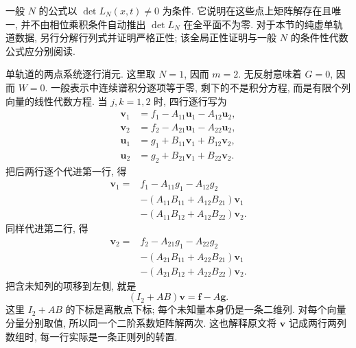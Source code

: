一般 $N$ 的公式以 $\det L_N(x,t)\ne0$ 为条件.
它说明在这些点上矩阵解存在且唯一,
并不由相位乘积条件自动推出 $\det L_N$ 在全平面不为零.
对于本节的纯虚单轨道数据,
另行分解行列式并证明严格正性;
该全局正性证明与一般 $N$ 的条件性代数公式应分别阅读.



\par\smallskip\noindent 单轨道的两点系统逐行消元.\quad
这里取 $N=1$, 因而 $m=2$. 无反射意味着 $G=0$, 因而 $W=0$.
一般表示中连续谱积分逐项等于零, 剩下的不是积分方程, 而是有限个列向量的线性代数方程.
当 $j,k=1,2$ 时, 四行逐行写为
\begin{equation*}
\begin{aligned}
\mathbf v_1
&=f_1- A_{11}\mathbf u_1- A_{12}\mathbf u_2,\\
\mathbf v_2
&=f_2- A_{21}\mathbf u_1- A_{22}\mathbf u_2,\\
\mathbf u_1
&=g_1+ B_{11}\mathbf v_1+ B_{12}\mathbf v_2,\\
\mathbf u_2
&=g_2+ B_{21}\mathbf v_1+ B_{22}\mathbf v_2.
\end{aligned}
\end{equation*}
把后两行逐个代进第一行, 得
\begin{equation*}
\begin{aligned}
\mathbf v_1
={}&f_1- A_{11}g_1- A_{12}g_2\\
&-( A_{11} B_{11}
+ A_{12} B_{21})\mathbf v_1\\
&-( A_{11} B_{12}
+ A_{12} B_{22})\mathbf v_2.
\end{aligned}
\end{equation*}
同样代进第二行, 得
\begin{equation*}
\begin{aligned}
\mathbf v_2
={}&f_2- A_{21}g_1- A_{22}g_2\\
&-( A_{21} B_{11}
+ A_{22} B_{21})\mathbf v_1\\
&-( A_{21} B_{12}
+ A_{22} B_{22})\mathbf v_2.
\end{aligned}
\end{equation*}
把含未知列的项移到左侧, 就是
\begin{equation*}
(I_2+ A B)\boldsymbol v
=\boldsymbol f- A\boldsymbol g.
\end{equation*}
这里 $I_2+ A B$ 的下标是离散点下标;
每个未知量本身仍是一条二维列.
对每个向量分量分别取值, 所以同一个二阶系数矩阵解两次.
这也解释原文将 $\boldsymbol v$ 记成两行两列数组时, 每一行实际是一条正则列的转置.

